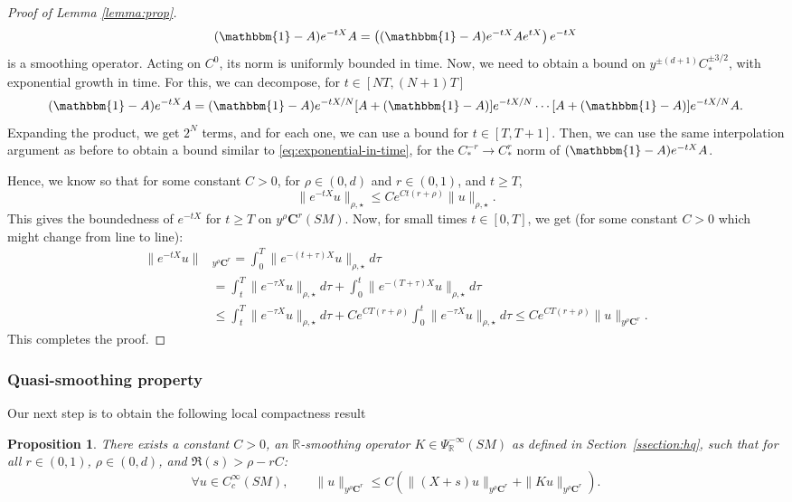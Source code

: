 \documentclass[JEP,XML,SOM,Unicode,NoFloatCountersInSection]{cedram}
\newcommand{\bC}{\boldsymbol{C}}
\newcommand{\R}{\mathbb{R}}
\theoremstyle{plain}
\newtheorem{proposition}{Proposition}[section]
\theoremstyle{definition}
\begin{document}
\begin{proof}[Proof of Lemma \ref{lemma:prop}]
\[
(\mathbbm{1}-A) e^{-tX} A = \left((\mathbbm{1}-A) e^{-tX} A e^{tX}\right)e^{-tX}
\]
is a smoothing operator. Acting on $C^0$, its norm is uniformly bounded in time. Now, we need to obtain a bound on $y^{\pm (d+1)}C^{\pm 3/2}_*$, with exponential growth in time. For this, we can decompose, for $t\in [NT, (N+1)T]$
\[
(\mathbbm{1}-A) e^{-t X} A = (\mathbbm{1}-A) e^{-tX/N}[ A+ (\mathbbm{1}-A)]e^{-tX/N}\cdots [A+(\mathbbm{1}-A)] e^{-tX/N}A.
\]
Expanding the product, we get $2^N$ terms, and for each one, we can use a bound for $t\in [T,T+1]$. Then, we can use the same interpolation argument as before to obtain a bound similar to \eqref{eq:exponential-in-time}, for the $C^{-r}_*\to C^r_*$ norm of $(\mathbbm{1}-A)e^{-tX} A$.

Hence, we know so that for some constant $C > 0$, for $\rho\in (0,d)$ and $r\in (0,1)$, and $t\geq T$,
\[
\| e^{-tX}u\|_{\rho,\star} \leq C e^{C t (r+ \rho)} \|u\|_{\rho,\star}.
\]
This gives the boundedness of $e^{-tX}$ for $t\geq T$ on $y^\rho \bC^r(SM)$. Now, for small times $t\in [0,T]$, we get (for some constant $C >0$ which might change from line to line):
\[
\begin{split}
\|e^{-tX}u\|&_{y^\rho \bC^r} = \int_0^T \| e^{-(t+\tau)X}u\|_{\rho,\star} d\tau \\
& = \int_t^T \|e^{-\tau X}u\|_{\rho,\star} d \tau + \int_0^t \|e^{-(T+\tau)X}u\|_{\rho,\star} d \tau \\
& \leq \int_t^T \|e^{-\tau X}u\|_{\rho,\star} d \tau + C e^{CT(r+\rho)} \int_0^t \|e^{-\tau X}u\|_{\rho,\star} d \tau \leq Ce^{CT(r+\rho)} \|u\|_{y^\rho \bC^r}.
\end{split}
\]
This completes the proof.
\end{proof}

\subsubsection{Quasi-smoothing property}

\label{sssection:smoothing}

Our next step is to obtain the following local compactness result
\begin{proposition}\label{prop:quasi-smoothing}
There exists a constant $C > 0$, an $\R$-smoothing operator $K \in \Psi^{-\infty}_{\R}(SM)$ as defined in Section~\ref{ssection:hq}, such that for all $r \in (0,1)$, $\rho \in (0,d)$, and $\Re(s) > \rho-rC$:
\[
\forall u \in C^\infty_{c}(SM), \qquad \|u\|_{y^\rho \bC^r} \leq C \left(\| (X+s)u\|_{y^\rho\bC^r} + \| K u\|_{y^\rho\bC^r}\right).
\]
\end{proposition}
\end{document}
